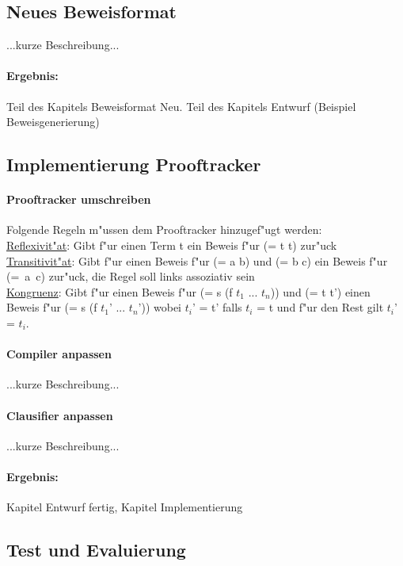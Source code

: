 \documentclass[a4paper]{article}
\begin{document}
\subsection{Neues Beweisformat}

...kurze Beschreibung...

\paragraph{Ergebnis:}
Teil des Kapitels Beweisformat Neu.
Teil des Kapitels Entwurf (Beispiel Beweisgenerierung)


\subsection{Implementierung Prooftracker}

\paragraph{Prooftracker umschreiben}
Folgende Regeln m"ussen dem Prooftracker hinzugef"ugt werden:\\
\uline{Reflexivit"at}: Gibt f"ur einen Term t ein Beweis f"ur (= t t) zur"uck\\
\uline{Transitivit"at}: Gibt f"ur einen Beweis f"ur (= a b) und (= b c) ein Beweis f"ur \mbox{(= a c)} zur"uck, die Regel soll links assoziativ sein\\
\uline{Kongruenz}: Gibt f"ur einen Beweis f"ur (= s (f $t_1$ ... $t_n$)) und (= t t') einen Beweis f"ur (= s (f $t_1$' ... $t_n$')) wobei $t_i$' = t' falls $t_i$ = t und f"ur den Rest gilt $t_i$' = $t_i$.\\

\paragraph{Compiler anpassen}

...kurze Beschreibung...
\paragraph{Clausifier anpassen}
...kurze Beschreibung...

\paragraph{Ergebnis:}
Kapitel Entwurf fertig, Kapitel Implementierung

\subsection{Test und Evaluierung}
\end{document}
